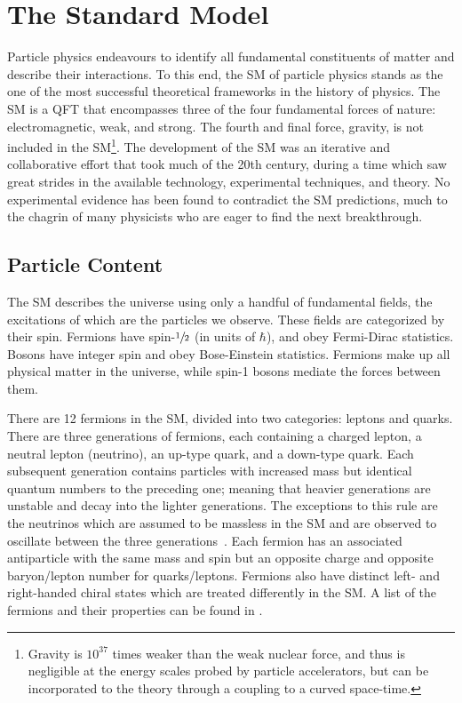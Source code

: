 \chapter{The Standard Model}
\label{ch:sm}

Particle physics endeavours to identify all fundamental constituents of matter and describe their interactions.
To this end, the \Gls{SM} of particle physics stands as the one of the most successful theoretical frameworks in the history of physics.
The \Gls{SM} is a \Gls{QFT} that encompasses three of the four fundamental forces of nature: electromagnetic, weak, and strong.
The fourth and final force, gravity, is not included in the \Gls{SM}\footnote{Gravity is $10^{37}$ times weaker than the weak nuclear force, and thus is negligible at the energy scales probed by particle accelerators, but can be incorporated to the theory through a coupling to a curved space-time.}.
The development of the \Gls{SM} was an iterative and collaborative effort that took much of the 20th century, during a time which saw great strides in the available technology, experimental techniques, and theory.
No experimental evidence has been found to contradict the \Gls{SM} predictions, much to the chagrin of many physicists who are eager to find the next breakthrough.

\section{Particle Content}

The \Gls{SM} describes the universe using only a handful of fundamental fields, the excitations of which are the particles we observe.
These fields are categorized by their spin.
Fermions have spin-$\sfrac{1}{2}$ (in units of $\hbar$), and obey Fermi-Dirac statistics.
Bosons have integer spin and obey Bose-Einstein statistics.
Fermions make up all physical matter in the universe, while spin-1 bosons mediate the forces between them.

There are 12 fermions in the \Gls{SM}, divided into two categories: leptons and quarks.
There are three generations of fermions, each containing a charged lepton, a neutral lepton (neutrino), an up-type quark, and a down-type quark.
Each subsequent generation contains particles with increased mass but identical quantum numbers to the preceding one; meaning that heavier generations are unstable and decay into the lighter generations.
The exceptions to this rule are the neutrinos which are assumed to be massless in the \Gls{SM} and are observed to oscillate between the three generations~\cite{SearchNeutrinosSun, NeutrinoOsc}.
Each fermion has an associated antiparticle with the same mass and spin but an opposite charge and opposite baryon/lepton number for quarks/leptons.
Fermions also have distinct left- and right-handed chiral states which are treated differently in the \Gls{SM}\@.
A list of the fermions and their properties can be found in .

